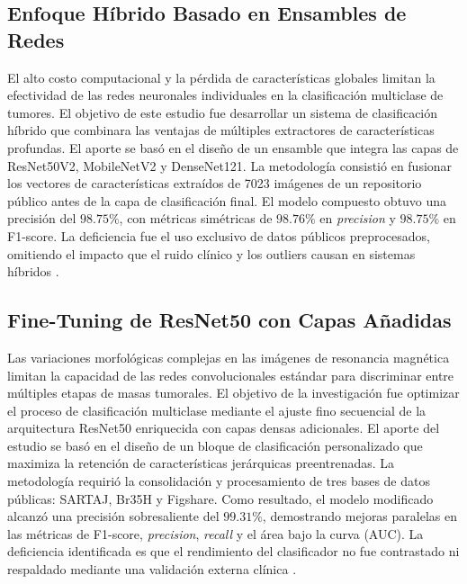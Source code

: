 \subsection{Enfoque Híbrido Basado en Ensambles de Redes}
El alto costo computacional y la pérdida de características globales limitan la efectividad de las redes neuronales individuales en la clasificación multiclase de tumores. El objetivo de este estudio fue desarrollar un sistema de clasificación híbrido que combinara las ventajas de múltiples extractores de características profundas. El aporte se basó en el diseño de un ensamble que integra las capas de ResNet50V2, MobileNetV2 y DenseNet121. La metodología consistió en fusionar los vectores de características extraídos de 7023 imágenes de un repositorio público antes de la capa de clasificación final. El modelo compuesto obtuvo una precisión del $98.75\%$, con métricas simétricas de $98.76\%$ en \textit{precision} y $98.75\%$ en F1-score. La deficiencia fue el uso exclusivo de datos públicos preprocesados, omitiendo el impacto que el ruido clínico y los outliers causan en sistemas híbridos \cite{DwiPrayogo2025}.

\subsection{Fine-Tuning de ResNet50 con Capas Añadidas}
Las variaciones morfológicas complejas en las imágenes de resonancia magnética limitan la capacidad de las redes convolucionales estándar para discriminar entre múltiples etapas de masas tumorales. El objetivo de la investigación fue optimizar el proceso de clasificación multiclase mediante el ajuste fino secuencial de la arquitectura ResNet50 enriquecida con capas densas adicionales. El aporte del estudio se basó en el diseño de un bloque de clasificación personalizado que maximiza la retención de características jerárquicas preentrenadas. La metodología requirió la consolidación y procesamiento de tres bases de datos públicas: SARTAJ, Br35H y Figshare. Como resultado, el modelo modificado alcanzó una precisión sobresaliente del $99.31\%$, demostrando mejoras paralelas en las métricas de F1-score, \textit{precision}, \textit{recall} y el área bajo la curva (AUC). La deficiencia identificada es que el rendimiento del clasificador no fue contrastado ni respaldado mediante una validación externa clínica \cite{Mitra2025}.


